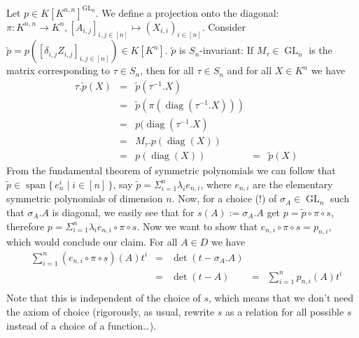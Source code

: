 \begin{example}
  Let $p \in K[K^{n,n}]^{\operatorname{GL_n}}$.
  We define a projection onto the diagonal:
  $\pi \colon K^{n,n} \longrightarrow K^n , [A_{i,j}]_{i,j \in [n]} \longmapsto (X_{i,i})_{i \in [n]} $.
  Consider $\tilde{p} = p \left( [ \delta_{i,j} Z_{i,j}]_{i,j \in [n]} \right) \in K[K^n]$.
  $\tilde{p}$ is $S_n$-invariant:
  If $M_\tau \in \operatorname{GL}_n$ is the matrix corresponding to $\tau \in S_n$, then for all $\tau \in S_n$ and for all $X \in K^n$ we have
  \begin{equation}
    \begin{aligned}
      &\tau.\tilde{p} (X) &=& \tilde{p} (\tau^{-1}.X)\\
      &&=& \tilde{p} (\pi (\operatorname{diag} (\tau^{-1} . X) ))\\
      &&=& p ( \operatorname{diag}(\tau^{-1}.X)\\
      &&=& M_\tau . p (\operatorname{diag}(X))\\
      &&=& p (\operatorname{diag}(X))&=& \tilde{p} (X)
    \end{aligned}
  \end{equation}
  From the fundamental theorem of symmetric polynomials we can follow that $\tilde{p} \in \operatorname{span}\{\,e_n^i \mid i \in [n]\,\}$, say $\tilde{p} = \Sigma_{i=1}^n \lambda_i e_{n,i}$, where $e_{n,i}$ are the elementary symmetric polynomials of dimension $n$.
  Now, for a choice (!) of $\sigma_A \in \operatorname{GL}_n$ such that $\sigma_A . A$ is diagonal, we easily see that for $s(A) := \sigma_A . A$ get $p = \tilde{p} \circ \pi \circ s$, therefore $p = \Sigma_{i=1}^n \lambda_i e_{n,i} \circ \pi \circ s$.
  Now we want to show that $e_{n,i} \circ \pi \circ s = p_{n,i}$, which would conclude our claim.
  For all $A\in D$ we have
  \begin{equation}
    \begin{aligned}
      &\sum_{i=1}^n (e_{n,i} \circ \pi \circ s)(A)t^i&=&\operatorname{det}(t-\sigma_A.A)\\
      &&=&\operatorname{det}(t-A)
      &=&\sum_{i=1}^n p_{n,i}(A)t^i\\
    \end{aligned}
  \end{equation}
  Note that this is independent of the choice of $s$, which means that we don't need the axiom of choice (rigorously, as usual, rewrite $s$ as a relation for all possible $s$ instead of a choice of a function\ldots).
\end{example}

